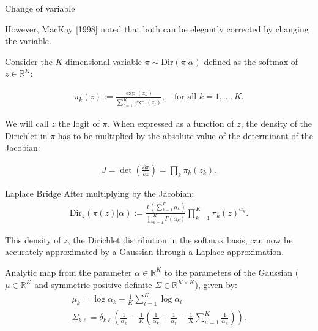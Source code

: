 \documentclass{beamer}
\begin{document}
\begin{frame}{Change of variable }

However, MacKay [1998] noted that both can
be elegantly corrected by changing the variable.

Consider the \( K \)-dimensional variable \( \pi \sim \text{Dir}(\pi | \alpha) \) defined as the softmax of \( z \in \mathbb{R}^K \):

\begin{gather*}
    \pi_k(z) := \frac{\exp(z_k)}{\sum_{l=1}^{K} \exp(z_l)}, \quad \text{for all } k = 1, \ldots, K.
\end{gather*}

We will call \( z \) the logit of \( \pi \). When expressed as a function of \( z \), the density of the Dirichlet in \( \pi \) has to be multiplied by the absolute value of the determinant of the Jacobian:

\begin{gather*}
    J = \det \left( \frac{\partial \pi}{\partial z} \right) = \prod_{k} \pi_k(z_k).
\end{gather*}
\end{frame}


\begin{frame}{Laplace Bridge}
\footntesize
After multiplying by the Jacobian:
\begin{gather*}
    \text{Dir}_z(\pi(z) | \alpha) := \frac{\Gamma\left(\sum_{k=1}^{K} \alpha_k\right)}{\prod_{k=1}^{K} \Gamma(\alpha_k)} \prod_{k=1}^{K} \pi_k(z)^{\alpha_k}.
\end{gather*}

This density of \( z \), the Dirichlet distribution in the softmax basis, can now be accurately approximated by a Gaussian through a Laplace approximation. 

Analytic map from the parameter \( \alpha \in \mathbb{R}^K_+ \) to the parameters of the Gaussian (\( \mu \in \mathbb{R}^K \) and symmetric positive definite \( \Sigma \in \mathbb{R}^{K \times K} \)), given by:
\begin{gather*}
    \mu_k = \log \alpha_k - \frac{1}{K} \sum_{l=1}^{K} \log \alpha_l \\
    \Sigma_{k\ell} = \delta_{k\ell} \left( \frac{1}{\alpha_k} - \frac{1}{K} \left( \frac{1}{\alpha_k} + \frac{1}{\alpha_\ell} - \frac{1}{K} \sum_{u=1}^{K} \frac{1}{\alpha_u} \right) \right).
\end{gather*}
\end{frame}
\end{document}
